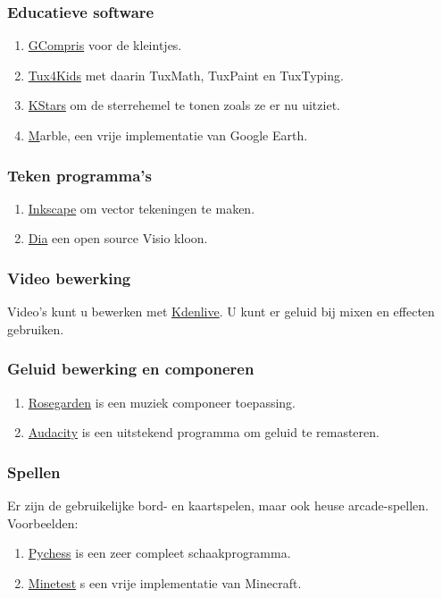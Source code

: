 \subsubsection{Educatieve software}
\begin{enumerate}
	\item \href{http://gcompris.net/index-en.html}{GCompris} voor de kleintjes.
	\item \href{http://tux4kids.alioth.debian.org/}{Tux4Kids} met daarin TuxMath, TuxPaint en TuxTyping.
	\item \href{https://edu.kde.org/kstars/}{KStars} om de sterrehemel te tonen zoals ze er nu uitziet.
	\item \href{https://edu.kde.org/marble/} Marble, een vrije implementatie van Google Earth.
\end{enumerate}

\subsubsection{Teken programma's}

\begin{enumerate}
	\item \href{https://inkscape.org/nl/}{Inkscape} om vector tekeningen te maken.
	\item \href{https://wiki.gnome.org/Apps/Dia}{Dia} een open source Visio kloon. 
\end{enumerate}

\subsubsection{Video bewerking}
Video's kunt u bewerken met \href{https://kdenlive.org/}{Kdenlive}. U kunt er geluid bij mixen en effecten gebruiken.

\subsubsection{Geluid bewerking en componeren}
\begin{enumerate}
	\item \href{http://www.rosegardenmusic.com/}{Rosegarden} is een muziek componeer toepassing.
	\item \href{http://audacity.sourceforge.net/}{Audacity} is een uitstekend programma om geluid te remasteren.
\end{enumerate}


\subsubsection{Spellen}
Er zijn de gebruikelijke bord- en kaartspelen, maar ook heuse arcade-spellen. Voorbeelden:
\begin{enumerate}
	\item \href{http://pychess.org/}{Pychess} is een zeer compleet schaakprogramma.
	\item \href{http://www.minetest.net/}{Minetest} s een vrije implementatie van Minecraft.
\end{enumerate}

